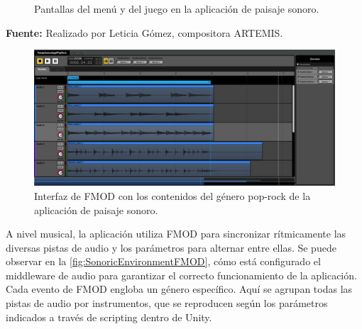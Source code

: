 \begin{figure}[h!]
	\centering
	\hfil
	\caption{Pantallas del menú y del juego en la aplicación de paisaje sonoro.}
	\label{fig:SonoricEnvironment}
\end{figure}

\begin{center}
	\textbf{Fuente:} Realizado por Leticia Gómez, compositora ARTEMIS.
	\vspace{-14pt}
\end{center}

\begin{figure}[h!]
	\centering
	\includegraphics[width=0.8\linewidth]{Figuras/Desarrollo/PaisajeSonoroFMOD.png}
	\caption[Interfaz de FMOD aplicación paisaje sonoro.]{Interfaz de FMOD con los contenidos del género pop-rock de la aplicación de paisaje sonoro.}
	\label{fig:SonoricEnvironmentFMOD}
\end{figure}

A nivel musical, la aplicación utiliza FMOD para sincronizar rítmicamente las diversas pistas de audio y los parámetros para alternar entre ellas. Se puede observar en la \autoref{fig:SonoricEnvironmentFMOD}, cómo está configurado el middleware de audio para garantizar el correcto funcionamiento de la aplicación. Cada evento de FMOD engloba un género específico. Aquí se agrupan todas las pistas de audio por instrumentos, que se reproducen según los parámetros indicados a través de scripting dentro de Unity.

